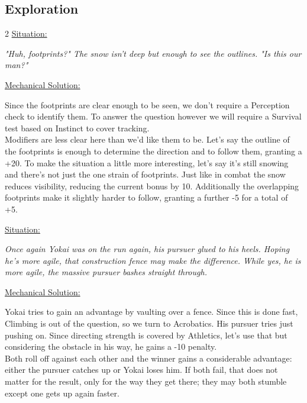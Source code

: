 \pagebreak
\subsection*{Exploration}
\vspace{4mm}
\begin{multicols}{2}
	\ul{Situation:}
	\begin{exampleblock}
		\textit{"Huh, footprints?" The snow isn't deep but enough to see the outlines. "Is this our man?"}
	\end{exampleblock}
	\ul{Mechanical Solution:}
	\begin{exampleblock}
		Since the footprints are clear enough to be seen, we don't require a Perception check to identify them. To answer the question however we will require a Survival test based on Instinct to cover tracking.\\
		Modifiers are less clear here than we'd like them to be. Let's say the outline of the footprints is enough to determine the direction and to follow them, granting a +20. To make the situation a little more interesting, let's say it's still snowing and there's not just the one strain of footprints. Just like in combat the snow reduces visibility, reducing the current bonus by 10. Additionally the overlapping footprints make it slightly harder to follow, granting a further -5 for a total of +5.
	\end{exampleblock}
	\columnbreak
	\ul{Situation:}
	\begin{exampleblock}
		\itshape
		Once again Yokai was on the run again,
			his pursuer glued to his heels.
		Hoping he's more agile, that construction fence may make the difference.
		While yes, he is more agile, the massive pursuer bashes straight through.
	\end{exampleblock}
	\ul{Mechanical Solution:}
	\begin{exampleblock}
		Yokai tries to gain an advantage by vaulting over a fence. Since this is done fast, Climbing is out of the question, so we turn to Acrobatics. His pursuer tries just pushing on. Since directing strength is covered by Athletics, let's use that but considering the obstacle in his way, he gains a -10 penalty.\\
		Both roll off against each other and the winner gains a considerable advantage: either the pursuer catches up or Yokai loses him. If both fail, that does not matter for the result, only for the way they get there; they may both stumble except one gets up again faster.
	\end{exampleblock}
\end{multicols}

